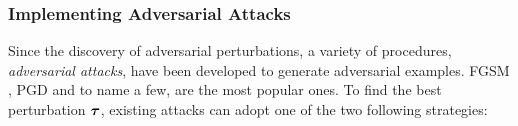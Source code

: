 \subsubsection{Implementing Adversarial Attacks}
\label{subsubsection:ch2-adversarial_attacks}

Since the discovery of adversarial perturbations, a variety of procedures, \aka \emph{adversarial attacks}, have been developed to generate adversarial examples.
FGSM \cite{goodfellow2014explaining}, PGD \cite{madry2018towards} and \cite{carlini2017towards} to name a few, are the most popular ones.
To find the best perturbation $\boldsymbol{\tau}$, existing attacks can adopt one of the two following strategies:

